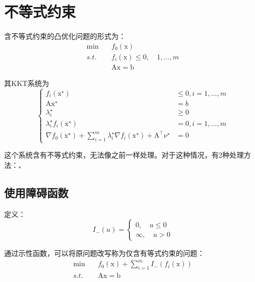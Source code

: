 \documentclass[a4paper]{D:/MyRepo/Script/latex/PaperReadingLog}
\begin{document}
\section{不等式约束}
含不等式约束的凸优化问题的形式为：
\begin{equation}
    \label{equ9}
    \begin{aligned}
        \min\quad &f_0(\mathrm{x})\\
        s.t.\quad &f_i(\mathrm{x})\le0,\quad 1,...,m\\
        &\mathrm{A}\mathrm{x}=\mathrm{b}
    \end{aligned}
\end{equation}

其KKT系统为
\begin{equation}
    \label{equ10}
    \left\{
    \begin{aligned}
        f_i(\mathrm{x}^\star)& \le0,i=1,...,m\\
        \mathrm{A}\mathrm{x}^\star&=b\\
        \lambda_i^\star&\ge0\\
        \lambda_i^\star f_i(\mathrm{x}^\star)&=0,i=1,...,m\\
        \nabla f_0(\mathrm{x}^\star)+\sum_{i=1}^m\lambda_i^\star \nabla f_i(\mathrm{x}^\star)+\mathrm{A}^\top\nu^\star&=0
    \end{aligned}
    \right.
\end{equation}

这个系统含有不等式约束，无法像之前一样处理。对于这种情况，有2种处理方法：、

\subsection{使用障碍函数}
定义：
$$
I_-(u)=\left\{
    \begin{aligned}
        0,\quad u\le0\\
        \infty,\quad u>0
    \end{aligned}
\right.
$$

通过示性函数，可以将原问题改写称为仅含有等式约束的问题：
\begin{equation}
    \label{equ11}
    \begin{aligned}
        \min\quad&f_0(\mathrm{x})+\sum_{i=1}^mI_-(f_i(\mathrm{x}))\\
        s.t.\quad&\mathrm{A}\mathrm{x}=\mathrm{b}
    \end{aligned}
\end{equation}
\end{document}
